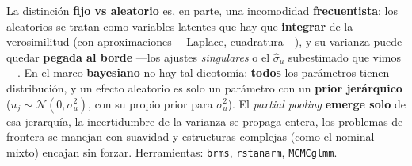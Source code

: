 \documentclass[
  letterpaper,
  DIV=11,
  numbers=noendperiod]{scrartcl}
\begin{document}
\begin{tcolorbox}[enhanced jigsaw, breakable, colframe=quarto-callout-note-color-frame, left=2mm, arc=.35mm, colbacktitle=quarto-callout-note-color!10!white, toprule=.15mm, colback=white, coltitle=black, rightrule=.15mm, opacitybacktitle=0.6, title=\textcolor{quarto-callout-note-color}{\faInfo}\hspace{0.5em}{Los efectos aleatorios encajan mejor en el enfoque bayesiano}, titlerule=0mm, toptitle=1mm, bottomtitle=1mm, leftrule=.75mm, bottomrule=.15mm, opacityback=0]

La distinción \textbf{fijo vs aleatorio} es, en parte, una incomodidad
\textbf{frecuentista}: los aleatorios se tratan como variables latentes
que hay que \textbf{integrar} de la verosimilitud (con aproximaciones
---Laplace, cuadratura---), y su varianza puede quedar \textbf{pegada al
borde} ---los ajustes \emph{singulares} o el \(\hat\sigma_u\)
subestimado que vimos---. En el marco \textbf{bayesiano} no hay tal
dicotomía: \textbf{todos} los parámetros tienen distribución, y un
efecto aleatorio es solo un parámetro con un \textbf{prior jerárquico}
(\(u_j\sim\mathcal{N}(0,\sigma_u^2)\), con su propio prior para
\(\sigma_u^2\)). El \emph{partial pooling} \textbf{emerge solo} de esa
jerarquía, la incertidumbre de la varianza se propaga entera, los
problemas de frontera se manejan con suavidad y estructuras complejas
(como el nominal mixto) encajan sin forzar. Herramientas: \texttt{brms},
\texttt{rstanarm}, \texttt{MCMCglmm}.

\end{tcolorbox}
\end{document}
